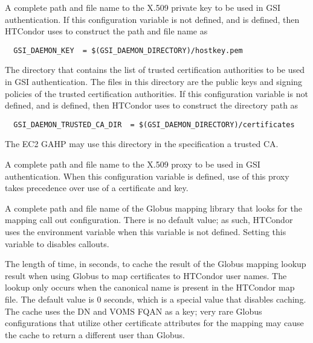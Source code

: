 \begin{description}
\label{param:GSIDaemonKey}
\item[\Macro{GSI\_DAEMON\_KEY}]
  A complete path and file name to the
  X.509 private key to be used in GSI authentication.
  If this configuration variable is not defined, and
   is defined, then HTCondor uses
   to construct the path and file name as
  \begin{verbatim}
  GSI_DAEMON_KEY  = $(GSI_DAEMON_DIRECTORY)/hostkey.pem
  \end{verbatim}

\label{param:GSIDaemonTrustedCADir}
\item[\Macro{GSI\_DAEMON\_TRUSTED\_CA\_DIR}]
  The directory that contains the
  list of trusted certification authorities to be used in GSI authentication.
  The files in this directory are the public keys and signing policies
  of the trusted certification authorities.
  If this configuration variable is not defined, and
   is defined, then HTCondor uses
   to construct the directory path as
  \begin{verbatim}
  GSI_DAEMON_TRUSTED_CA_DIR  = $(GSI_DAEMON_DIRECTORY)/certificates
  \end{verbatim}
  The EC2 GAHP may use this directory in the specification a trusted CA.

\label{param:GSIDaemonProxy}
\item[\Macro{GSI\_DAEMON\_PROXY}]
  A complete path and file name to the
  X.509 proxy to be used in GSI authentication.
  When this configuration variable is defined, use of this proxy
  takes precedence over use of a certificate and key.

\label{param:GSIAuthzConf}
\item[\Macro{GSI\_AUTHZ\_CONF}]
  A complete path and file name of the
  Globus mapping library that looks for the mapping call out configuration.
  There is no default value; as such, HTCondor uses the environment
  variable  when this variable is not defined.
  Setting this variable to  disables callouts.

\label{param:GSSAssistGridmapCacheExpiration}
\item[\Macro{GSS\_ASSIST\_GRIDMAP\_CACHE\_EXPIRATION}]
  The length of time, in seconds, to cache the result of the Globus mapping
  lookup result when using Globus to map certificates to HTCondor user names.
  The lookup only occurs when the canonical name 
  is present in the HTCondor map file.  
  The default value is 0 seconds, 
  which is a special value that disables caching.  
  The cache uses the DN and VOMS FQAN as a key;
  very rare Globus configurations that utilize other certificate attributes
  for the mapping may cause the cache to return a different user than Globus.


\end{description}
